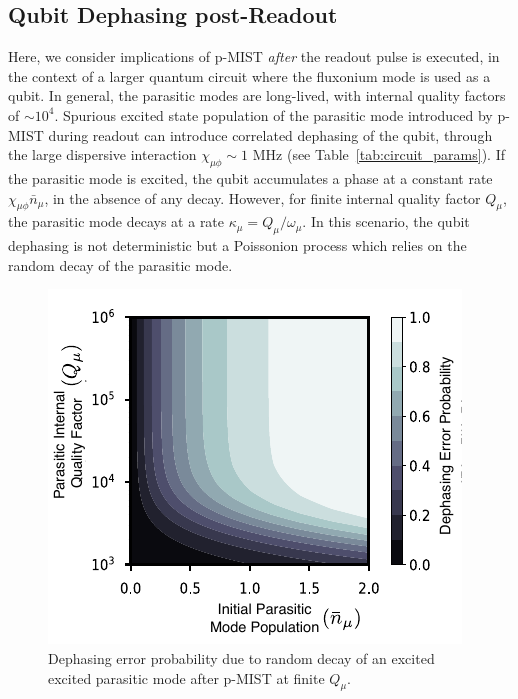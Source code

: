\documentclass[prx,showpacs,notitlepage,twocolumn,superscriptaddress,nofootinbib,preprintnumbers,floatfix]{revtex4-2}
\begin{document}
\subsection{Qubit Dephasing post-Readout} 
Here, we consider implications of p-MIST \textit{after} the readout pulse is executed, in the context of a larger quantum circuit where the fluxonium mode is used as a qubit. In general, the parasitic modes are long-lived, with internal quality factors of $\sim 10^{4}$\cite{masluk_microwave_2012, masluk2013reducing}. Spurious excited state population of the parasitic mode introduced by p-MIST during readout can introduce correlated dephasing of the qubit, through the large dispersive interaction $\chi_{\mu \phi} \sim 1$ MHz (see Table~\ref{tab:circuit_params}). If the parasitic mode is excited, the qubit accumulates a phase at a constant rate $\chi_{\mu\phi} \bar n_\mu$, in the absence of any decay. However, for finite internal quality factor $Q_\mu$, the parasitic mode decays at a rate $\kappa_\mu=Q_\mu/\omega_\mu$. In this scenario, the qubit dephasing is not deterministic but a Poissonion process which relies on the random decay of the parasitic mode. 

\begin{figure}[htb]
    \centering
    \includegraphics[width=\linewidth]{Fluxonium_Readout_manuscript/Figures/dephasing.pdf}
    \caption{Dephasing error probability due to random decay of an excited excited parasitic mode after p-MIST at finite $Q_\mu$.}
    \label{fig:dephasing}
\end{figure}
\end{document}
